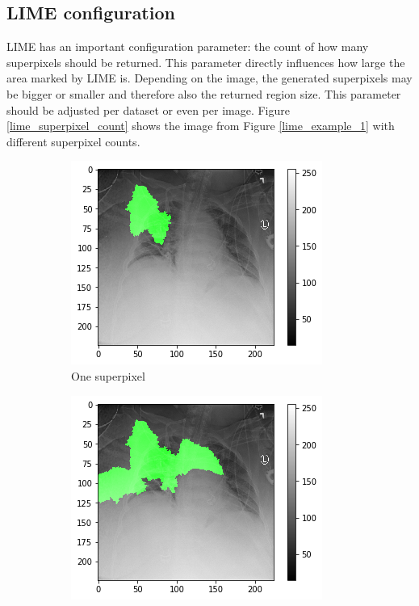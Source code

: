 \subsection{LIME configuration}
LIME has an important configuration parameter: the count of how many superpixels should be returned. This parameter directly influences how large the area marked by LIME is. Depending on the image, the generated superpixels may be bigger or smaller and therefore also the returned region size. This parameter should be adjusted per dataset or even per image. Figure \ref{lime_superpixel_count} shows the image from Figure \ref{lime_example_1} with different superpixel counts.

\begin{figure}[H]
    \centering
    \begin{subfigure}[b]{.4\textwidth}
        \centering
        \includegraphics[width=\linewidth]{chapters/03_classification/images/lime_sp_1.png}
        \caption{One superpixel}
    \end{subfigure}\hspace{1cm}%
    \begin{subfigure}[b]{.4\textwidth}
        \centering
        \includegraphics[width=\linewidth]{chapters/03_classification/images/lime_sp_3.png}

\end{subfigure}
\end{figure}
